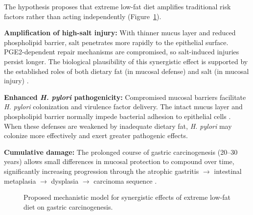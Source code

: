 \documentclass[review]{elsarticle}
\begin{document}
The hypothesis proposes that extreme low-fat diet amplifies traditional risk factors rather than acting independently (Figure~\ref{fig:mechanism}).

\textbf{Amplification of high-salt injury:} With thinner mucus layer and reduced phospholipid barrier, salt penetrates more rapidly to the epithelial surface. PGE2-dependent repair mechanisms are compromised, so salt-induced injuries persist longer. The biological plausibility of this synergistic effect is supported by the established roles of both dietary fat (in mucosal defense) and salt (in mucosal injury) \cite{delia2012,wallace2008}.

\textbf{Enhanced \textit{H. pylori} pathogenicity:} Compromised mucosal barriers facilitate \textit{H. pylori} colonization and virulence factor delivery. The intact mucus layer and phospholipid barrier normally impede bacterial adhesion to epithelial cells \cite{lichtenberger1995}. When these defenses are weakened by inadequate dietary fat, \textit{H. pylori} may colonize more effectively and exert greater pathogenic effects.

\textbf{Cumulative damage:} The prolonged course of gastric carcinogenesis (20--30 years) allows small differences in mucosal protection to compound over time, significantly increasing progression through the atrophic gastritis $\rightarrow$ intestinal metaplasia $\rightarrow$ dysplasia $\rightarrow$ carcinoma sequence \cite{correa1988}.

\begin{figure}[htbp]
\centering
{}
\caption{Proposed mechanistic model for synergistic effects of extreme low-fat diet on gastric carcinogenesis.}
\label{fig:mechanism}
\end{figure}
\end{document}
